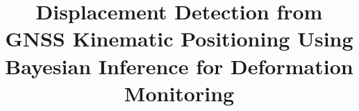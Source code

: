 \documentclass[final,3p,times]{elsarticle}
\begin{document}
	
	\begin{frontmatter}
		
		
		
		\title{\textcolor{r_s}{Displacement Detection from GNSS Kinematic Positioning Using Bayesian Inference for Deformation Monitoring}}
		

\end{frontmatter}
\end{document}
